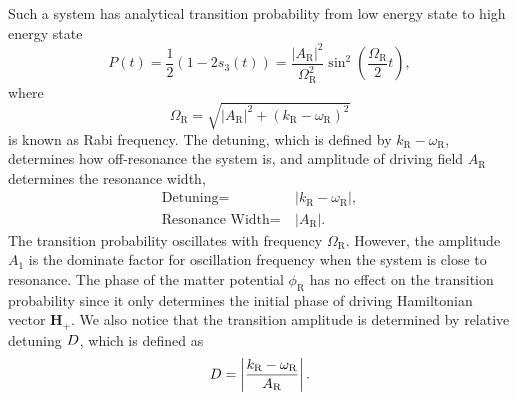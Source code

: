 Such a system has analytical transition probability from low energy state to high energy state
\begin{equation}
    P(t) = \frac{1}{2}(1- 2 s_3(t))= \frac{\left \lvert A_{\mathrm{R}} \right \rvert ^2}{ \Omega_{\mathrm R}^2 } \sin^2 \left( \frac{\Omega_{\mathrm R}}{2} t \right),
    \label{rabi-system-transition-probability}
\end{equation}
where
\begin{equation}
\Omega_{\mathrm R} = \sqrt{ \lvert A_{\mathrm{R}}\rvert^2 + (k_{\mathrm{R}} - \omega_{\mathrm R})^2 }
\end{equation} is known as Rabi frequency. The detuning, which is defined by $k_{\mathrm{R}} - \omega_{\mathrm R}$, determines how off-resonance the system is, and amplitude of driving field $A_{\mathrm{R}}$ determines the resonance width,
\begin{align}
\text{Detuning} =&~\lvert k_{\mathrm{R}} - \omega_{\mathrm R} \rvert, \\
\text{Resonance Width} =&~\lvert A_{\mathrm R} \rvert.
\end{align}
The transition probability oscillates with frequency $\Omega_{\mathrm R}$. However, the amplitude $A_1$ is the dominate factor for oscillation frequency when the system is close to resonance. The phase of the matter potential $\phi_{\mathrm{R}}$ has no effect on the transition probability since it only determines the initial phase of driving Hamiltonian vector $\mathbf{H}_+$. We also notice that the transition amplitude is determined by relative detuning $D$, which is defined as
\begin{equation}
    D = \left\lvert \frac{ k_{\mathrm R} - \omega_{\mathrm R}}{A_{\mathrm R}} \right\rvert.
\end{equation}


